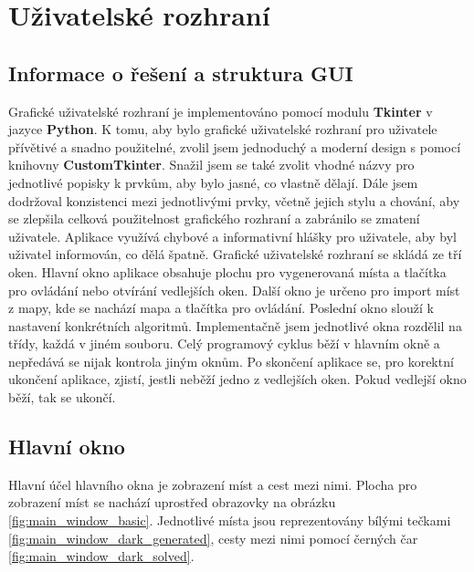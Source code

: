 \chapter{Uživatelské rozhraní} 
\section{Informace o řešení a struktura GUI}
Grafické uživatelské rozhraní je implementováno pomocí modulu \textbf{Tkinter} v jazyce \textbf{Python}. K tomu, aby bylo grafické uživatelské rozhraní pro uživatele přívětivé a snadno použitelné, zvolil jsem jednoduchý a moderní design s pomocí knihovny \textbf{CustomTkinter}. Snažil jsem se také zvolit vhodné názvy pro jednotlivé popisky k prvkům, aby bylo jasné, co vlastně dělají. Dále jsem dodržoval konzistenci mezi jednotlivými prvky, včetně jejich stylu a chování, aby se zlepšila celková použitelnost grafického rozhraní a zabránilo se zmatení uživatele. Aplikace využívá chybové a informativní hlášky pro uživatele, aby byl uživatel informován, co dělá špatně. Grafické uživatelské rozhraní se skládá ze tří oken. Hlavní okno aplikace obsahuje plochu pro vygenerovaná místa a tlačítka pro ovládání nebo otvírání vedlejších oken. Další okno je určeno pro import míst z mapy, kde se nachází mapa a tlačítka pro ovládání. Poslední okno slouží k nastavení konkrétních algoritmů. Implementačně jsem jednotlivé okna rozdělil na třídy, každá v jiném souboru. Celý programový cyklus běží v hlavním okně a nepředává se nijak kontrola jiným oknům. Po skončení aplikace se, pro korektní ukončení aplikace, zjistí, jestli neběží jedno z vedlejších oken. Pokud vedlejší okno běží, tak se ukončí.


\section{Hlavní okno} \label{sec:main window}
Hlavní účel hlavního okna je zobrazení míst a cest mezi nimi. Plocha pro zobrazení míst se nachází uprostřed obrazovky na obrázku \ref{fig:main_window_basic}. Jednotlivé místa jsou reprezentovány bílými tečkami \ref{fig:main_window_dark_generated}, cesty mezi nimi pomocí černých čar \ref{fig:main_window_dark_solved}. 

